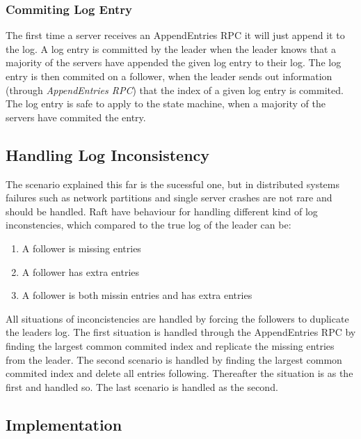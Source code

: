 
\subsubsection{Commiting Log Entry} %
\label{ssub:commiting_log_entry}

The first time a server receives an AppendEntries RPC it will just append it to the log. A log entry is committed by the leader when the leader knows that a majority of the servers have appended the given log entry to their log. The log entry is then commited on a follower, when the leader sends out information (through \emph{AppendEntries RPC}) that the index of a given log entry is commited. The log entry is safe to apply to the state machine, when a majority of the servers have commited the entry.


\subsection{Handling Log Inconsistency} %
\label{sub:handling_log_inconsistency}

The scenario explained this far is the sucessful one, but in distributed systems failures such as network partitions and single server crashes are not rare and should be handled. Raft have behaviour for handling different kind of log inconstencies, which compared to the true log of the leader can be:

\begin{enumerate}
  \item A follower is missing entries
  \item A follower has extra entries
  \item A follower is both missin entries and has extra entries
\end{enumerate}

All situations of inconcistencies are handled by forcing the followers to duplicate the leaders log. The first situation is handled through the AppendEntries RPC by finding the largest common commited index and replicate the missing entries from the leader. The second scenario is handled by finding the largest common commited index and delete all entries following. Thereafter the situation is as the first and handled so. The last scenario is handled as the second.


\subsection{Implementation} %
\label{sub:log_replication_implementation}



